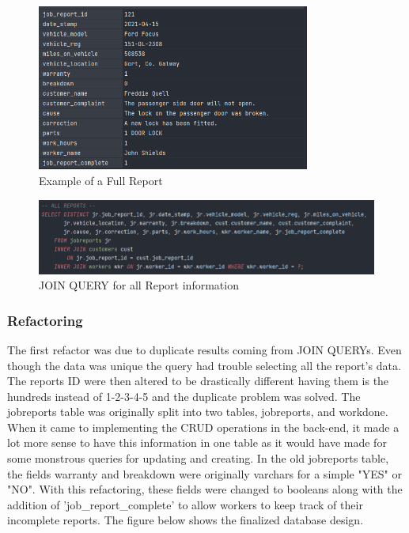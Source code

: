 \begin{figure}[H]
    \caption{Example of a Full Report}
    \label{image:dbReport}
    \centering
    \includegraphics[width=0.8\textwidth]{images/database/job_report.png}
\end{figure}

\begin{figure}[H]
    \caption{JOIN QUERY  for all Report information}
    \label{image:join}
    \centering
    \includegraphics[width=1.0\textwidth]{images/database/raw_mysql_join.png}
\end{figure}

\subsubsection{Refactoring}
The first refactor was due to duplicate results coming from JOIN QUERYs. Even though the data was unique the query had trouble selecting all the report's data. The reports ID were then altered to be drastically different having them is the hundreds instead of 1-2-3-4-5 and the duplicate problem was solved. The jobreports table was originally split into two tables, jobreports, and workdone. When it came to implementing the CRUD operations in the back-end, it made a lot more sense to have this information in one table as it would have made for some monstrous queries for updating and creating. In the old jobreports table, the fields warranty and breakdown were originally varchars for a simple "YES" or "NO". With this refactoring, these fields were changed to booleans along with the addition of 'job\_report\_complete' to allow workers to keep track of their incomplete reports. The figure below shows the finalized database design.

